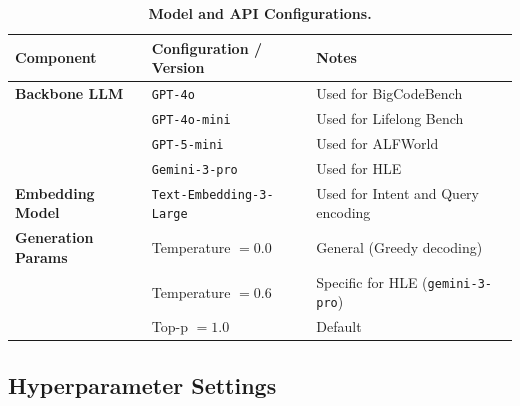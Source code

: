 \documentclass{article}
\theoremstyle{plain}
\theoremstyle{definition}
\theoremstyle{remark}
\begin{document}
\begin{table}[H]
    \centering
    \caption{\textbf{Model and API Configurations.}}
    \label{tab:model_specs}
    \begin{tabular}{l l l}
        \toprule
        \textbf{Component} & \textbf{Configuration / Version} & \textbf{Notes} \\
        \midrule
        \textbf{Backbone LLM} & \texttt{GPT-4o} & Used for BigCodeBench \\
                              & \texttt{GPT-4o-mini} & Used for Lifelong Bench \\
                              & \texttt{GPT-5-mini} & Used for ALFWorld \\
                              & \texttt{Gemini-3-pro} & Used for HLE \\
        \midrule
        \textbf{Embedding Model} & \texttt{Text-Embedding-3-Large} & Used for Intent and Query encoding \\
        \midrule
        \textbf{Generation Params} & Temperature $= 0.0$ & General (Greedy decoding) \\
                                   & Temperature $= 0.6$ & Specific for HLE (\texttt{gemini-3-pro}) \\
                                   & Top-p $= 1.0$ & Default \\
        \bottomrule
    \end{tabular}
\end{table}



\subsection{Hyperparameter Settings}
\end{document}
